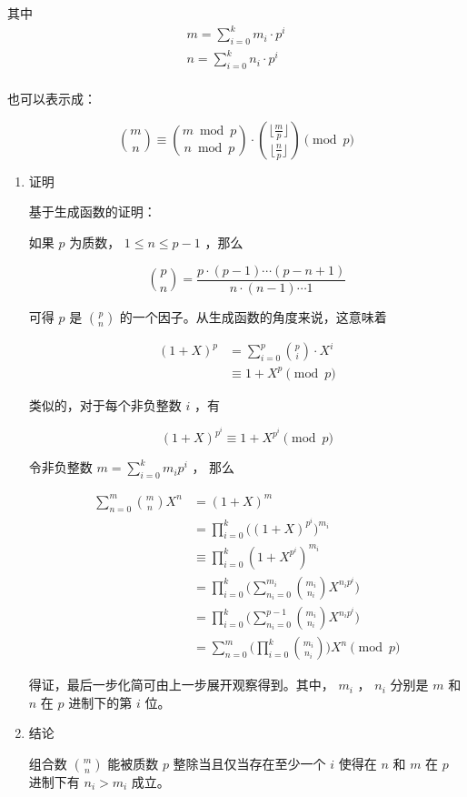 \documentclass[11pt]{article}
\begin{document}
其中
$$ \begin{aligned}
m = \sum_{i=0}^k m_i \cdot p^i\\
n=\sum_{i=0}^k n_i \cdot p^i\\
\end{aligned} $$

也可以表示成：

$$
\binom{m}{n} \equiv \binom{m \bmod p}{n \bmod p} \cdot \binom{\lfloor\frac{m}{p} \rfloor}{\lfloor \frac{n}{p} \rfloor} \pmod p
$$


\begin{enumerate}
\item 证明
\label{sec-3-3-1-1}

基于生成函数的证明：

如果 $p$ 为质数， $1\leq n \leq p-1$ ，那么

$$
\binom{p}{n} = \frac{p \cdot (p - 1) \cdots (p - n + 1)}{n \cdot (n - 1) \cdots 1}
$$

可得 $p$  是 $\binom{p}{n}$ 的一个因子。从生成函数的角度来说，这意味着

$$ \begin{aligned}
(1 + X)^p &= \sum_{i=0}^p \binom{p}{i}\cdot X^i\\
&\equiv 1+X^p \pmod p
\end{aligned} $$

类似的，对于每个非负整数 $i$ ，有

$$
(1+X)^{p^i} \equiv 1 + X^{p^i} \pmod p
$$

令非负整数 $m=\sum_{i=0}^k m_i p^i$ ， 那么

$$ \begin{aligned}
\sum_{n=0}^m \binom{m}{n}X^n &= (1 + X)^m \\
&=\prod_ {i=0}^k \Big ((1+X)^{p^i} \Big) ^{m_i}\\
&\equiv \prod_{i=0}^k(1+X^{p^i})^{m_i}\\
&=\prod_{i=0}^k\bigg ( \sum_{n_i=0}^{m_i} \binom{m_i}{n_i}X^{n_i p^i} \bigg)\\
&=\prod_{i=0}^k \bigg (\sum_{n_i=0}^{p-1} \binom{m_i}{n_i}X^{n_ip^i} \bigg)\\
&=\sum_{n=0}^m \bigg(\prod_{i=0}^k \binom{m_i}{n_i} \bigg) X^n \pmod p
\end{aligned} $$

得证，最后一步化简可由上一步展开观察得到。其中， $m_i$ ， $n_i$ 分别是 $m$ 和 $n$ 在 $p$ 进制下的第 $i$ 位。

\item 结论
\label{sec-3-3-1-2}

组合数 $\binom{m}{n}$ 能被质数 $p$ 整除当且仅当存在至少一个 $i$ 使得在 $n$ 和 $m$ 在 $p$ 进制下有 $n_i > m_i$ 成立。
\end{enumerate}
\end{document}
